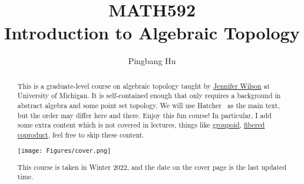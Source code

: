 \documentclass[a4paper]{report}
\author{Pingbang Hu}
\title{MATH592\\Introduction to Algebraic Topology}
\begin{document}
\maketitle

\begin{abstract}
	This is a graduate-level course on algebraic topology taught by \href{http://www.math.lsa.umich.edu/~jchw/}{Jennifer Wilson} at University of Michigan. It is self-contained enough that only requires a background in abstract algebra and some point set topology. We will use Hatcher~\cite{hatcher2002algebraic} as the main text, but the order may differ here and there. Enjoy this fun course! In particular, I add some extra content which is not covered in lectures, things like \hyperref[def:groupoid]{groupoid}, \hyperref[def:fibered-coproduct]{fibered coproduct}, feel free to skip these content.

	\vfill
	\begin{center}
		\texttt{[image: Figures/cover.png]}
	\end{center}
	\vfill
	This course is taken in Winter 2022, and the date on the cover page is the last updated time.
\end{abstract}

\tableofcontents

\newpage


\newpage
\appendix
\appendixpage{}



\newpage
\printbibliography{}
\end{document}
